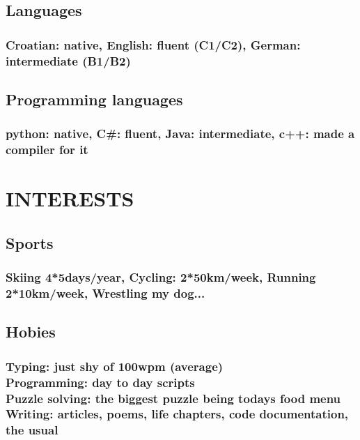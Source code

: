 \documentclass{article}
\begin{document}
\subsection{Languages}
\subsubsection{Croatian: native, English: fluent (C1/C2), German: intermediate (B1/B2)}

\subsection{Programming languages}
\subsubsection{python: native, C\#: fluent, Java: intermediate, c++: made a compiler for it}

\section{INTERESTS}
\subsection{Sports}
\subsubsection{Skiing 4*5days/year, Cycling: 2*50km/week, Running 2*10km/week, Wrestling my dog...}

\subsection{Hobies}
\subsubsection{Typing: just shy of 100wpm (average)
\\Programming: day to day scripts
\\Puzzle solving: the biggest puzzle being todays food menu
\\Writing: articles, poems, life chapters, code documentation, the usual}
\end{document}
